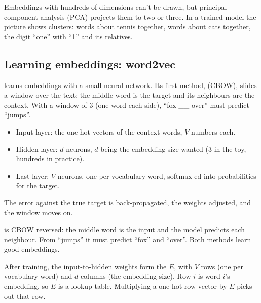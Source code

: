 \begin{remark}
Embeddings with hundreds of dimensions can't be drawn, but principal component analysis (PCA) projects them to two or three. In a trained model the picture shows clusters: words about tennis together, words about cats together, the digit ``one'' with ``1'' and its relatives.
\end{remark}

\subsection*{Learning embeddings: word2vec}

\begin{definition}
 learns embeddings with a small neural network. Its first method,  (CBOW), slides a window over the text; the middle word is the target and its neighbours are the context. With a window of 3 (one word each side), ``fox \_\_ over'' must predict ``jumps''.
\begin{itemize}
  \item Input layer: the one-hot vectors of the context words, $V$ numbers each.
  \item Hidden layer: $d$ neurons, $d$ being the embedding size wanted (3 in the toy, hundreds in practice).
  \item Last layer: $V$ neurons, one per vocabulary word, softmax-ed into probabilities for the target.
\end{itemize}
The error against the true target is back-propagated, the weights adjusted, and the window moves on.
\end{definition}

\begin{definition}
 is CBOW reversed: the middle word is the input and the model predicts each neighbour. From ``jumps'' it must predict ``fox'' and ``over''. Both methods learn good embeddings.
\end{definition}

\begin{definition}
After training, the input-to-hidden weights form the  $E$, with $V$ rows (one per vocabulary word) and $d$ columns (the embedding size). Row $i$ is word $i$'s embedding, so $E$ is a lookup table. Multiplying a one-hot row vector by $E$ picks out that row.
\end{definition}

